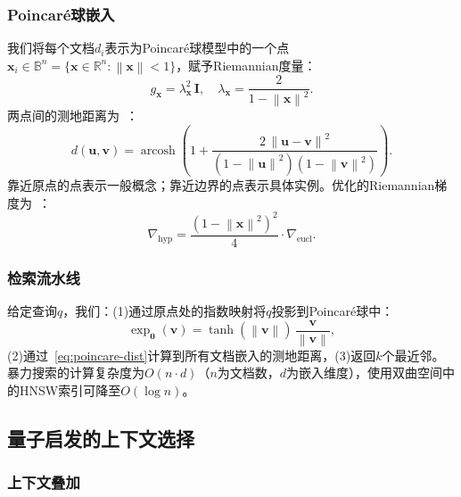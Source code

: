 \documentclass[journal]{IEEEtran}
\newcommand{\R}{\mathbb{R}}
\newcommand{\B}{\mathbb{B}}
\newcommand{\norm}[1]{\left\|#1\right\|}
\begin{document}
\subsubsection{Poincar\'{e}球嵌入}

我们将每个文档$d_i$表示为Poincar\'{e}球模型中的一个点$\mathbf{x}_i \in \B^n = \{\mathbf{x} \in \R^n : \norm{\mathbf{x}} < 1\}$，赋予Riemannian度量：
\begin{equation}
  g_{\mathbf{x}} = \lambda_{\mathbf{x}}^{2}\,\mathbf{I}, \quad
  \lambda_{\mathbf{x}} = \frac{2}{1 - \norm{\mathbf{x}}^{2}}.
  \label{eq:conformal}
\end{equation}
两点间的测地距离为~\cite{nickel2017poincare}：
\begin{equation}
  d(\mathbf{u}, \mathbf{v}) =
    \operatorname{arcosh}\!\left(
      1 + \frac{2\,\norm{\mathbf{u} - \mathbf{v}}^{2}}
               {(1 - \norm{\mathbf{u}}^{2})(1 - \norm{\mathbf{v}}^{2})}
    \right).
  \label{eq:poincare-dist}
\end{equation}
靠近原点的点表示一般概念；靠近边界的点表示具体实例。优化的Riemannian梯度为~\cite{nickel2017poincare}：
\begin{equation}
  \nabla_{\mathrm{hyp}} =
    \frac{(1 - \norm{\mathbf{x}}^{2})^{2}}{4}
    \cdot \nabla_{\mathrm{eucl}}.
  \label{eq:riemannian-grad}
\end{equation}

\subsubsection{检索流水线}

给定查询$q$，我们：(1)通过原点处的指数映射将$q$投影到Poincar\'{e}球中：
\begin{equation}
  \exp_{\mathbf{0}}(\mathbf{v}) =
    \tanh(\norm{\mathbf{v}})\,
    \frac{\mathbf{v}}{\norm{\mathbf{v}}},
  \label{eq:expmap}
\end{equation}
(2)通过~\eqref{eq:poincare-dist}计算到所有文档嵌入的测地距离，(3)返回$k$个最近邻。暴力搜索的计算复杂度为$O(n \cdot d)$（$n$为文档数，$d$为嵌入维度），使用双曲空间中的HNSW索引可降至$O(\log n)$。

\subsection{量子启发的上下文选择}
\label{sec:quantum}

\subsubsection{上下文叠加}
\end{document}
